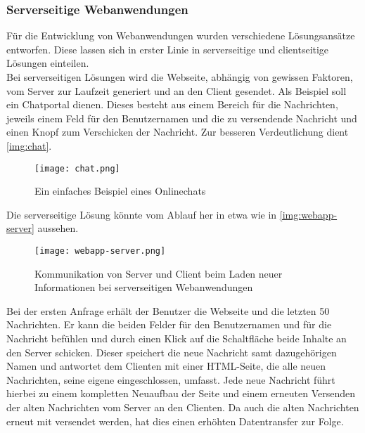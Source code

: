 \subsubsection{Serverseitige Webanwendungen}
\label{sec:server-webanwendung}

Für die Entwicklung von Webanwendungen wurden verschiedene Lösungsansätze entworfen. Diese lassen sich in erster Linie in serverseitige und clientseitige Lösungen einteilen.  \\
Bei serverseitigen Lösungen wird die Webseite, abhängig von gewissen Faktoren, vom Server zur Laufzeit generiert und an den Client gesendet. Als Beispiel soll ein Chatportal dienen. Dieses besteht aus einem Bereich für die Nachrichten, jeweils einem Feld für den Benutzernamen und die zu versendende Nachricht und einen Knopf zum Verschicken der Nachricht. Zur besseren Verdeutlichung dient \autoref{img:chat}.

\begin{figure}[H]
	\begin{center}
		\texttt{[image: chat.png]}
		\caption{Ein einfaches Beispiel eines Onlinechats}
		\label{img:chat}
	\end{center}
\end{figure}

Die serverseitige Lösung könnte vom Ablauf her in etwa wie in \autoref{img:webapp-server} aussehen.

\begin{figure}[H]
	\begin{center}
		\texttt{[image: webapp-server.png]}
		\caption{Kommunikation von Server und Client beim Laden neuer Informationen bei serverseitigen Webanwendungen}
		\label{img:webapp-server}
	\end{center}
\end{figure}


Bei der ersten Anfrage erhält der Benutzer die Webseite und die letzten 50 Nachrichten. Er kann die beiden Felder für den Benutzernamen und für die Nachricht befühlen und durch einen Klick auf die Schaltfläche  beide Inhalte an den Server schicken. Dieser speichert die neue Nachricht samt dazugehörigen Namen und antwortet dem Clienten mit einer HTML-Seite, die alle neuen Nachrichten, seine eigene eingeschlossen, umfasst. Jede neue Nachricht führt hierbei zu einem kompletten Neuaufbau der Seite und einem erneuten Versenden der alten Nachrichten vom Server an den Clienten. Da auch die alten Nachrichten erneut mit versendet werden, hat dies einen erhöhten Datentransfer zur Folge.

